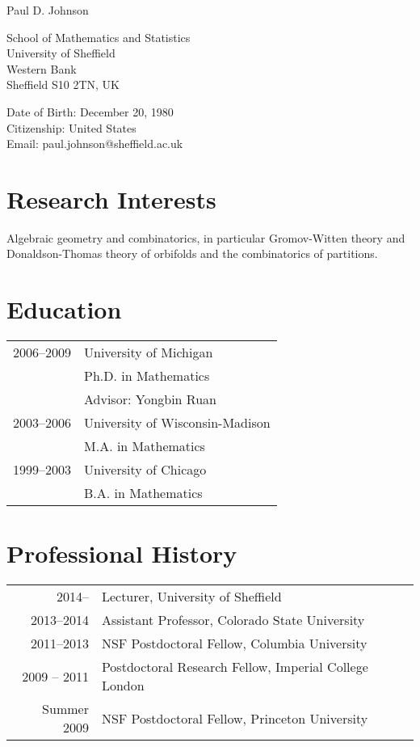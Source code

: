 \documentclass[11pt,letterpaper]{article}
\def\name{Paul D. Johnson}
\renewenvironment{itemize}{
  \begin{list}{}{
    \setlength{\leftmargin}{1.5em}
  }
}{
  \end{list}
}
\begin{document}
{\huge \name}


\vspace{0.25in}

\begin{minipage}[t]{0.5\textwidth}
School of Mathematics and Statistics \\
University of Sheffield \\
Western Bank \\
Sheffield S10 2TN, UK
\end{minipage}
\begin{minipage}[t]{0.5\textwidth}
  Date of Birth: December 20, 1980 \\
  Citizenship: United States \\
  Email: paul.johnson@sheffield.ac.uk
  \end{minipage}

\section*{Research Interests}
\begin{itemize}
\item Algebraic geometry and combinatorics, in particular Gromov-Witten theory and Donaldson-Thomas theory of orbifolds and the combinatorics of partitions.
\end{itemize}

\section*{Education}
\begin{tabular}{rl}
   2006--2009 & University of Michigan \\
  & Ph.D. in Mathematics \\
  & Advisor: Yongbin Ruan \\
  \rule{0pt}{3ex}2003--2006 &  University of Wisconsin-Madison\\
  & M.A. in Mathematics \\
  \rule{0pt}{3ex}1999--2003 &  University of Chicago \\
  & B.A. in Mathematics \\


\end{tabular}


\section*{Professional History}
\begin{tabular}{rl}
2014-- & Lecturer, University of Sheffield \\
\rule{0pt}{3ex} 2013--2014 & Assistant Professor, Colorado State University \\
\rule{0pt}{3ex} 2011--2013 & NSF Postdoctoral Fellow, Columbia University \\
\rule{0pt}{3ex}2009 -- 2011 & Postdoctoral Research Fellow, Imperial College London \\
\rule{0pt}{3ex} Summer 2009 & NSF Postdoctoral Fellow, Princeton University
\end{tabular}
\end{document}
